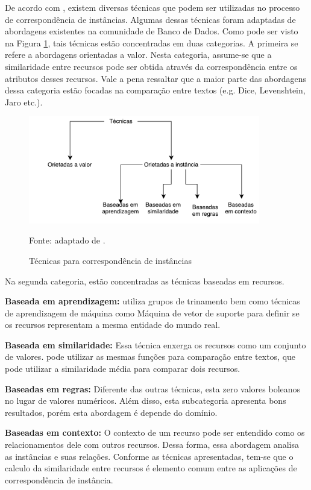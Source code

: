 De acordo com \cite{castano2011ontology}, existem diversas técnicas que podem ser utilizadas no processo de correspondência de instâncias. Algumas dessas técnicas foram adaptadas de abordagens existentes na comunidade de Banco de Dados. Como pode ser visto na Figura \ref{fig:im_techniques}, tais técnicas estão concentradas em duas categorias. A primeira se refere a abordagens orientadas a valor. Nesta categoria, assume-se que a similaridade entre recursos pode ser obtida através da correspondência entre os atributos desses recursos. Vale a pena ressaltar que a maior parte das abordagens dessa categoria estão focadas na comparação entre textos (e.g. Dice, Levenshtein, Jaro etc.).

\begin{figure}[!h]
	\centering
	\includegraphics[width=0.9\textwidth]{./imagens/im_techniques.pdf}
	\caption{Técnicas para correspondência de instâncias}
	\footnotesize{Fonte: adaptado de \cite{castano2011ontology}.}
	\label{fig:im_techniques}
\end{figure}

Na segunda categoria, estão concentradas as técnicas baseadas em recursos. 

\textbf{Baseada em aprendizagem:} utiliza grupos de trinamento bem como técnicas de aprendizagem de máquina como Máquina de vetor de suporte para definir se os recursos representam a mesma entidade do mundo real.

\textbf{Baseada em similaridade:} Essa técnica enxerga os recursos como um conjunto de valores. pode utilizar as mesmas funções para comparação entre textos, que pode utilizar a similaridade média para comparar dois recursos. 

\textbf{Baseadas em regras:} Diferente das outras técnicas, esta zero valores boleanos no lugar de valores numéricos. Além disso, esta subcategoria apresenta bons resultados, porém esta abordagem é depende do domínio. 

\textbf{Baseadas em contexto:} O contexto de um recurso pode ser entendido como os relacionamentos dele com outros recursos. Dessa forma, essa abordagem analisa as instâncias e suas relações.
Conforme as técnicas apresentadas, tem-se que o calculo da similaridade entre recursos é elemento comum entre as aplicações de correspondência de instância.

